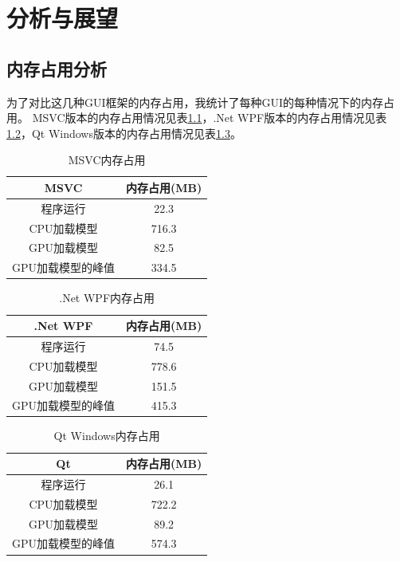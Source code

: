 \chapter{分析与展望}
\label{chapter:12}

\section{内存占用分析}

为了对比这几种GUI框架的内存占用，我统计了每种GUI的每种情况下的内存占用。
MSVC版本的内存占用情况见表\ref{tab:memory_msvc}，.Net WPF版本的内存占用情况见表\ref{tab:memory_dotnet}，Qt Windows版本的内存占用情况见表\ref{tab:memory_qt_windows}。

\begin{table}[!ht]
	\centering
	\caption{MSVC内存占用}
	\begin{tabular}{cc}
		\hline
		MSVC & 内存占用(MB) \\ \hline
		程序运行 & 22.3 \\
		CPU加载模型 & 716.3 \\
		GPU加载模型 & 82.5 \\
		GPU加载模型的峰值 & 334.5 \\ \hline
	\end{tabular}
	\label{tab:memory_msvc}
\end{table}

\begin{table}[!ht]
	\centering
	\caption{.Net WPF内存占用}
	\begin{tabular}{cc}
		\hline
		.Net WPF & 内存占用(MB) \\ \hline
		程序运行 & 74.5 \\
		CPU加载模型 & 778.6 \\
		GPU加载模型 & 151.5 \\
		GPU加载模型的峰值 & 415.3 \\ \hline
	\end{tabular}
	\label{tab:memory_dotnet}
\end{table}

\begin{table}[!ht]
	\centering
	\caption{Qt Windows内存占用}
	\begin{tabular}{cc}
		\hline
		Qt & 内存占用(MB) \\ \hline
		程序运行 & 26.1 \\
		CPU加载模型 & 722.2 \\
		GPU加载模型 & 89.2 \\
		GPU加载模型的峰值 & 574.3 \\ \hline
	\end{tabular}
	\label{tab:memory_qt_windows}
\end{table}


